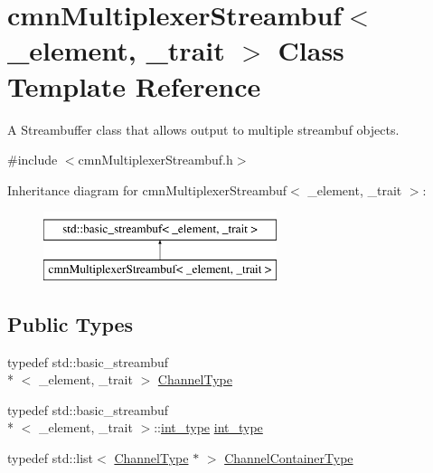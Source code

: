 \hypertarget{classcmn_multiplexer_streambuf}{\section{cmn\-Multiplexer\-Streambuf$<$ \-\_\-element, \-\_\-trait $>$ Class Template Reference}
\label{classcmn_multiplexer_streambuf}
}


A Streambuffer class that allows output to multiple streambuf objects.  




{\ttfamily \#include $<$cmn\-Multiplexer\-Streambuf.\-h$>$}

Inheritance diagram for cmn\-Multiplexer\-Streambuf$<$ \-\_\-element, \-\_\-trait $>$\-:\begin{figure}[H]
\begin{center}
\leavevmode
\includegraphics[height=2.000000cm]{d0/d78/classcmn_multiplexer_streambuf}
\end{center}
\end{figure}
\subsection*{Public Types}
\begin{DoxyCompactItemize}
\item 
typedef std\-::basic\-\_\-streambuf\\*
$<$ \-\_\-element, \-\_\-trait $>$ \hyperlink{classcmn_multiplexer_streambuf_a7eb353f0b5fed1a2c8707712aac82095}{Channel\-Type}
\item 
typedef std\-::basic\-\_\-streambuf\\*
$<$ \-\_\-element, \-\_\-trait $>$\-::\hyperlink{classcmn_multiplexer_streambuf_aaa63d7e4ef3d7ef78dee540971ec88e9}{int\-\_\-type} \hyperlink{classcmn_multiplexer_streambuf_aaa63d7e4ef3d7ef78dee540971ec88e9}{int\-\_\-type}
\item 
typedef std\-::list$<$ \hyperlink{classcmn_multiplexer_streambuf_a7eb353f0b5fed1a2c8707712aac82095}{Channel\-Type} $\ast$ $>$ \hyperlink{classcmn_multiplexer_streambuf_a3b414c7f89b55584aef7c8b655bc03ea}{Channel\-Container\-Type}
\end{DoxyCompactItemize}

